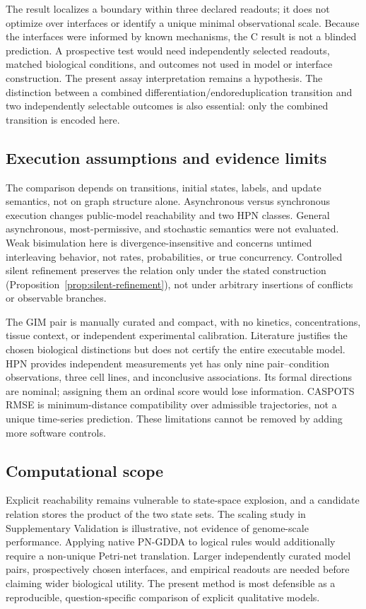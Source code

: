 The result localizes a boundary within three declared readouts; it does not
optimize over interfaces or identify a unique minimal observational scale.
Because the interfaces were informed by known mechanisms, the C result is not
a blinded prediction. A prospective test would need independently selected
readouts, matched biological conditions, and outcomes not used in model or
interface construction. The present assay interpretation remains a hypothesis.
The distinction between a combined differentiation/endoreduplication transition
and two independently selectable outcomes is also essential: only the combined
transition is encoded here.

\subsection{Execution assumptions and evidence limits}
The comparison depends on transitions, initial states, labels, and update
semantics, not on graph structure alone. Asynchronous versus synchronous
execution changes public-model reachability and two HPN classes. General
asynchronous, most-permissive, and stochastic semantics were not evaluated.
\cite{Pauleve2020} Weak bisimulation here is divergence-insensitive and concerns
untimed interleaving behavior, not rates, probabilities, or true concurrency.
Controlled silent refinement preserves the relation only under the stated
construction (Proposition~\ref{prop:silent-refinement}), not under arbitrary
insertions of conflicts or observable branches.

The GIM pair is manually curated and compact, with no kinetics, concentrations,
tissue context, or independent experimental calibration. Literature justifies
the chosen biological distinctions but does not certify the entire executable
model. HPN provides independent measurements yet has only nine pair--condition
observations, three cell lines, and inconclusive associations. Its formal
directions are nominal; assigning them an ordinal score would lose information.
CASPOTS RMSE is minimum-distance compatibility over admissible trajectories,
not a unique time-series prediction. These limitations cannot be removed by
adding more software controls.

\subsection{Computational scope}
Explicit reachability remains vulnerable to state-space explosion, and a
candidate relation stores the product of the two state sets. The scaling study
in Supplementary Validation is illustrative, not evidence of genome-scale
performance. Applying native PN-GDDA to logical rules would additionally require
a non-unique Petri-net translation. Larger independently curated model pairs,
prospectively chosen interfaces, and empirical readouts are needed before
claiming wider biological utility. The present method is most defensible as a
reproducible, question-specific comparison of explicit qualitative models.

